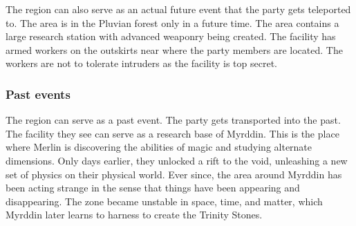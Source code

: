 The region can also serve as an actual future event that the party gets teleported to. The area is in the Pluvian forest only in a future time. The area contains a large research station with advanced weaponry being created. The facility has armed workers on the outskirts near where the party members are located. The workers are not to tolerate intruders as the facility is top secret.

\subsubsection{Past events}

The region can serve as a past event. The party gets transported into the past. The facility they see can serve as a research base of Myrddin. This is the place where Merlin is discovering the abilities of magic and studying alternate dimensions. Only days earlier, they unlocked a rift to the void, unleashing a new set of physics on their physical world. Ever since, the area around Myrddin has been acting strange in the sense that things have been appearing and disappearing. The zone became unstable in space, time, and matter, which Myrddin later learns to harness to create the Trinity Stones. 

